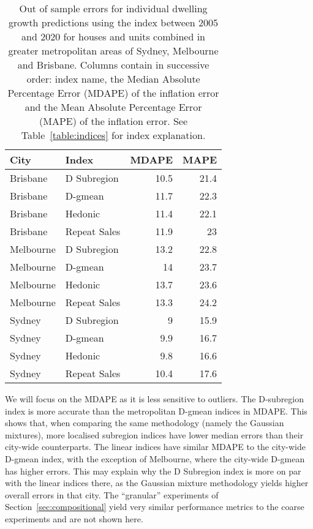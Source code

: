 \begin{table}[h!]
\centering
\begin{tabular}{llrr}
\toprule
     City &        Index &  MDAPE &  MAPE \\
\midrule
 Brisbane &  D Subregion &   10.5 &  21.4 \\
 Brisbane &      D-gmean &   11.7 &  22.3 \\
 Brisbane &      Hedonic &   11.4 &  22.1 \\
 Brisbane & Repeat Sales &   11.9 &  23  \\
Melbourne &  D Subregion &   13.2 &  22.8 \\
Melbourne &      D-gmean &   14 &  23.7 \\
Melbourne &      Hedonic &   13.7 &  23.6 \\
Melbourne & Repeat Sales &   13.3 &  24.2 \\
   Sydney &  D Subregion &    9  &  15.9 \\
   Sydney &      D-gmean &    9.9 &  16.7 \\
   Sydney &      Hedonic &    9.8 &  16.6 \\
   Sydney & Repeat Sales &   10.4 &  17.6 \\
\bottomrule
\end{tabular}
\caption{Out of sample errors for individual dwelling growth predictions using the index between 2005 and 2020 for houses and units combined in greater metropolitan areas of Sydney, Melbourne and Brisbane.  Columns contain in successive order: index name, 
the Median Absolute Percentage Error (MDAPE) of the inflation error and the Mean Absolute Percentage Error (MAPE) of the inflation error. See Table~\ref{table:indices} for index explanation.}
\label{table:performance}
\end{table}
 

 We will focus on the MDAPE as it is less sensitive to outliers. The D-subregion index is more accurate than the metropolitan D-gmean indices in MDAPE. This shows that, when comparing the same methodology (namely the Gaussian mixtures), more localised subregion indices have lower median errors than their city-wide counterparts.
 The linear indices have similar MDAPE to the city-wide D-gmean index, with the exception of Melbourne, where the city-wide D-gmean has higher errors. This may explain why the D Subregion index is more on par with the linear indices there, as the Gaussian mixture methodology yields higher overall errors in that city. 
  The ``granular'' experiments of Section~\ref{sec:compositional} yield very similar performance metrics to the coarse experiments and are not shown here. 

